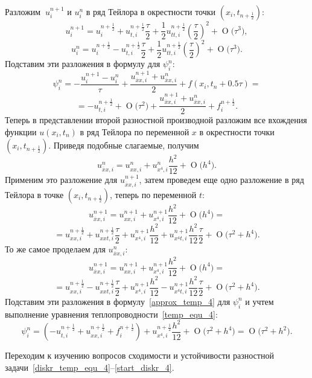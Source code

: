 \documentclass[11pt,a4paper,twoside,listtotoc,bibtotoc]{report}
\numberwithin{equation}{section}
\theoremstyle{definition}
\theoremstyle{plain}
\newcommand{\bigO}[1]{\ensuremath{\operatorname{O}\bigl(#1\bigr)}}
\begin{document}
\begin{solution}
%
    Разложим $~u_i^{n + 1}$ и $u_i^n $ в ряд Тейлора в
    окрестности точки $(x_i,t_{n + \frac12})$:
    $$
        u_i^{n + 1} = u_i^{n + \frac12} + u_{t,i}^{n + \frac12}\dfrac{\tau}2 +
        \dfrac12 u_{tt,i}^{n + \frac12}\left(\dfrac{\tau}{2}\right)^2 +
        \bigO{\tau^3},
    $$
    $$
        u_i^{n} = u_i^{n + \frac12} - u_{t,i}^{n + \frac12}\dfrac{\tau}2 +
        \dfrac12 u_{tt,i}^{n + \frac12}\left(\dfrac{\tau}{2}\right)^2 +
        \bigO{\tau^3}.
    $$
    Подставим эти разложения в формулу для $\psi_i^n$:
    $$
        \psi_i^n =  -\dfrac{u_i^{n + 1} - u_i^n}{\tau} +
        \frac{u_{\overline{x}x,i}^{n + 1} + u_{\overline{x}x,i}^{n}}{2}
        + f(x_i,t_n + 0.5\tau) =
    $$
    $$
        = -u_{t,i}^{n + \frac12} + \bigO{\tau^2} + \frac{u_{\overline{x}x,i}^{n + 1}
        + u_{\overline{x}x,i}^{n}}{2} + f_i^{n + \frac12}.
    $$
    Теперь в представлении второй разностной производной разложим все вхождения
    функции $u(x_i, t_n)$ в ряд Тейлора по переменной $x$
    в окрестности точки $(x_i,t_{n + \frac12})$.
    Приведя подобные слагаемые, получим
    $$
        u_{\overline{x}x,i}^{n} = u_{xx,i}^{n} + u_{x^4,i}^{n}\dfrac{h^2}{12} +
        \bigO{h^4}.
    $$
    Применим это разложение для $u_{\overline{x}x,i}^{n + 1}$, затем проведем
    еще одно разложение в ряд Тейлора в точке $(x_i, t_{n + \frac12})$,
    теперь по переменной $t$:
    $$
        u_{\overline{x}x,i}^{n + 1} = u_{xx,i}^{n + 1} + u_{x^4,i}^{n + 1}\dfrac{h^2}{12}
        + \bigO{h^4} =
    $$
    $$
        = u_{xx,i}^{n + \frac12} + u_{xxt,i}^{n + \frac12}\dfrac{\tau}{2} +
        u_{x^4,i}^{n + 1}\dfrac{h^2}{12} + u_{x^4t,i}^{n + 1}\dfrac{h^2}{12}\dfrac{\tau}{2}
        + \bigO{\tau^2 + h^4}.
    $$
    То же самое проделаем для $u_{\overline{x}x,i}^{n}$:
    $$
        u_{\overline{x}x,i}^{n + 1} = u_{xx,i}^{n + 1} + u_{x^4,i}^{n + 1}\dfrac{h^2}{12}
        + \bigO{h^4} =
    $$
    $$
        = u_{xx,i}^{n + \frac12} - u_{xxt,i}^{n + \frac12}\dfrac{\tau}{2} +
        u_{x^4,i}^{n + 1}\dfrac{h^2}{12} - u_{x^4t,i}^{n+1}
        \dfrac{h^2}{12}\dfrac{\tau}{2} + \bigO{\tau^2 + h^4}.
    $$
    Подставим эти разложения в формулу~\eqref{approx_temp_4} для $\psi_i^n$
    и учтем выполнение уравнения теплопроводности~\eqref{temp_equ_4}:
    $$
        \psi_i^n = (-u_{t,i}^{n + \frac12} + u_{xx,i}^{n + \frac12} + f_i^{n + \frac12})
        + u_{x^4,i}^{n + \frac12}\dfrac{h^2}{12} + \bigO{\tau^2 + h^4} =
        \bigO{\tau^2 + h^2}.
    $$
%
\end{solution}
%
\fi
Переходим к изучению вопросов сходимости и устойчивости разностной
задачи~\eqref{diskr_temp_equ_4}--\eqref{start_diskr_4}.
\end{document}
